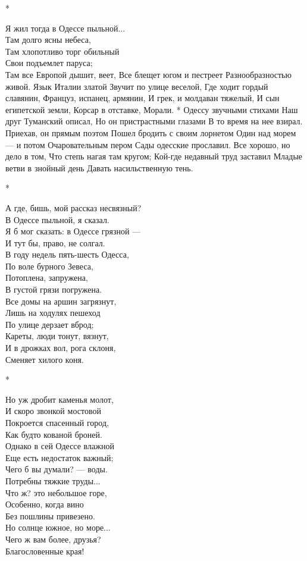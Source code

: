 *

Я жил тогда в Одессе пыльной...\\
Там долго ясны небеса,\\
Там хлопотливо торг обильный\\
Свои подъемлет паруса;\\
Там все Европой дышит, веет,
Все блещет югом и пестреет
Разнообразностью живой.
Язык Италии златой
Звучит по улице веселой,
Где ходит гордый славянин,
Француз, испанец, армянин,
И грек, и молдаван тяжелый,
И сын египетской земли,
Корсар в отставке, Морали.
*
Одессу звучными стихами
Наш друг Туманский описал,
Но он пристрастными глазами
В то время на нее взирал.
Приехав, он прямым поэтом
Пошел бродить с своим лорнетом
Один над морем — и потом
Очаровательным пером
Сады одесские прославил.
Все хорошо, но дело в том,
Что степь нагая там кругом;
Кой-где недавный труд заставил
Младые ветви в знойный день
Давать насильственную тень.

*

А где, бишь, мой рассказ несвязный?\\
В Одессе пыльной, я сказал.\\
Я б мог сказать: в Одессе грязной —\\
И тут бы, право, не солгал.\\
В году недель пять-шесть Одесса,\\
По воле бурного Зевеса,\\
Потоплена, запружена,\\
В густой грязи погружена.\\
Все домы на аршин загрязнут,\\
Лишь на ходулях пешеход\\
По улице дерзает вброд;\\
Кареты, люди тонут, вязнут,\\
И в дрожках вол, рога склоня,\\
Сменяет хилого коня.

*

Но уж дробит каменья молот,\\
И скоро звонкой мостовой\\
Покроется спасенный город,\\
Как будто кованой броней.\\
Однако в сей Одессе влажной\\
Еще есть недостаток важный;\\
Чего б вы думали? — воды.\\
Потребны тяжкие труды...\\
Что ж? это небольшое горе,\\
Особенно, когда вино\\
Без пошлины привезено.\\
Но солнце южное, но море...\\
Чего ж вам более, друзья?\\
Благословенные края!

